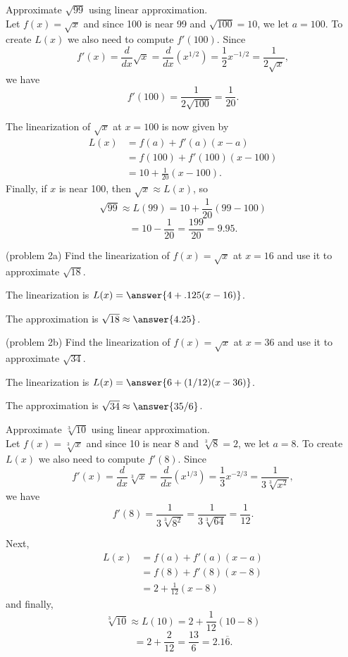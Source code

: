 \documentclass[handout]{ximera}
\begin{document}
\begin{example}[example 2]
Approximate $\sqrt{99}$ using linear approximation. \\
Let $f(x) = \sqrt x$ and since 100 is near 99 and $\sqrt{100} = 10$, we let 
$a = 100$. To create $L(x)$ we also need to compute $f'(100)$. 
Since 
\[f'(x) = \frac{d}{dx} \sqrt x = \frac{d}{dx}(x^{1/2})= \frac{1}{2}x^{-1/2}   = \frac{1}{2\sqrt x},\] 
we have
\[f'(100) = \frac{1}{2\sqrt{100}} = \frac{1}{20}.\]

The linearization of $\sqrt x$ at $x=100$ is now given by
\begin{align*}
L(x) &= f(a) + f'(a)(x - a) \\
&= f(100) + f'(100)(x - 100) \\
&= 10 + \frac{1}{20}(x - 100).
\end{align*}
Finally, if $x$ is near 100, then $\sqrt x \approx L(x)$, so
\[\sqrt{99} \approx L(99) = 10 + \frac{1}{20}(99 - 100)\]
\[ = 10 - \frac{1}{20} = \frac{199}{20} = 9.95.\]
\end{example}

\begin{problem}(problem 2a)
Find the linearization of $f(x) = \sqrt x$ at $x = 16$ and use it to approximate $\sqrt{18}$.

The linearization is  $L(x) = \answer{4 + .125 (x-16)}$.

The approximation is $\sqrt{18} \approx \answer{4.25}$.
\end{problem}

\begin{problem}(problem 2b)
Find the linearization of $f(x) = \sqrt x$ at $x = 36$ and use it to approximate $\sqrt{34}$.

The linearization is  $L(x) = \answer{6 + (1/12) (x-36)}$.

The approximation is $\sqrt{34} \approx \answer{35/6}$.
\end{problem}

\begin{foldable}
\end{foldable}


\begin{example}[example 3]
Approximate $\sqrt[3]{10}$ using linear approximation.\\ 
Let $f(x) = \sqrt[3] x$ and since 10 is near 8 and $\sqrt[3]{8} = 2$, we let 
$a = 8$. To create $L(x)$ we also need to compute $f'(8)$. 
Since 
\[f'(x) = \frac{d}{dx} \sqrt[3] x = \frac{d}{dx}(x^{1/3})= \frac{1}{3}x^{-2/3}   = \frac{1}{3\sqrt[3] {x^2}},\] 
we have
\[f'(8) = \frac{1}{3\sqrt[3]{8^2}} =\frac{1}{3\sqrt[3]{64}}= \frac{1}{12}.\]

Next, 
\begin{align*}
L(x) &= f(a) + f'(a)(x - a) \\
&= f(8) + f'(8)(x - 8) \\
&= 2 + \frac{1}{12}(x - 8)
\end{align*}
and finally,
\[\sqrt[3]{10} \approx L(10) = 2 + \frac{1}{12}(10 - 8)\]
\[ = 2 + \frac{2}{12} = \frac{13}{6} = 2.1{\overline 6}.\]
\end{example}
\end{document}
